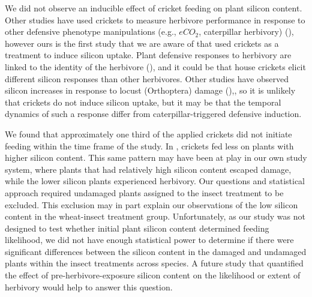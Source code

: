 \documentclass[12pt, letterpaper]{report}
\begin{document}
We did not observe an inducible effect of cricket feeding on plant silicon content. Other studies have used crickets to measure herbivore performance in response to other defensive phenotype manipulations (e.g., $eCO_2$, caterpillar herbivory) (\cite{ryalls_impacts_2017,biru_contrasting_2022}), however ours is the first study that we are aware of that used crickets as a treatment to induce silicon uptake. Plant defensive responses to herbivory are linked to the identity of the herbivore (\cite{amsberry_effects_2006,afkhami_endophyte-mediated_2009,carrillo2012induction,carrillo_loss_2014}), and it could be that house crickets elicit different silicon responses than other herbivores. Other studies have observed silicon increases in response to locust (Orthoptera) damage (\cite{massey_herbivore_2007,garbuzov_interactive_2011}),, so it is unlikely that crickets do not induce silicon uptake, but it may be that the temporal dynamics of such a response differ from caterpillar-triggered defensive induction. 

We found that approximately one third of the applied crickets did not initiate feeding within the time frame of the study. In \textcite{ryalls_impacts_2017}, crickets fed less on plants with higher silicon content. This same pattern may have been at play in our own study system, where plants that had relatively high silicon content escaped damage, while the lower silicon plants experienced herbivory. Our questions and statistical approach required undamaged plants assigned to the insect treatment to be excluded. This exclusion may in part explain our observations of the low silicon content in the wheat-insect treatment group. Unfortunately, as our study was not designed to test whether initial plant silicon content determined feeding likelihood, we did not have enough statistical power to determine if there were significant differences between the silicon content in the damaged and undamaged plants within the insect treatments across species. A future study that quantified the effect of pre-herbivore-exposure silicon content on the likelihood or extent of herbivory would help to answer this question.
\end{document}
